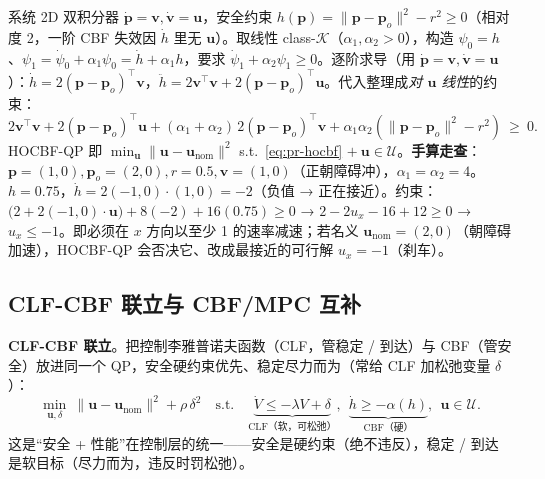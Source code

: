 \begin{derivation}\label{der:pr-hocbf}
系统 2D 双积分器 $\dot{\mathbf{p}}=\mathbf{v},\dot{\mathbf{v}}=\mathbf{u}$，安全约束 $h(\mathbf{p})=\|\mathbf{p}-\mathbf{p}_o\|^2-r^2\ge0$（相对度 2，一阶 CBF 失效因 $\dot h$ 里无 $\mathbf{u}$）。取线性 class-$\mathcal{K}$（$\alpha_1,\alpha_2>0$），构造 $\psi_0=h$、$\psi_1=\dot\psi_0+\alpha_1\psi_0=\dot h+\alpha_1 h$，要求 $\dot\psi_1+\alpha_2\psi_1\ge0$。逐阶求导（用 $\dot{\mathbf{p}}=\mathbf{v},\dot{\mathbf{v}}=\mathbf{u}$）：$\dot h=2(\mathbf{p}-\mathbf{p}_o)^\top\mathbf{v}$，$\ddot h=2\mathbf{v}^\top\mathbf{v}+2(\mathbf{p}-\mathbf{p}_o)^\top\mathbf{u}$。代入整理成\emph{对 $\mathbf{u}$ 线性}的约束：
\begin{equation}
  2\mathbf{v}^\top\mathbf{v}+2(\mathbf{p}-\mathbf{p}_o)^\top\mathbf{u}+(\alpha_1+\alpha_2)\,2(\mathbf{p}-\mathbf{p}_o)^\top\mathbf{v}+\alpha_1\alpha_2(\|\mathbf{p}-\mathbf{p}_o\|^2-r^2)\ \ge\ 0.
  \label{eq:pr-hocbf}
\end{equation}
HOCBF-QP 即 $\min_{\mathbf{u}}\|\mathbf{u}-\mathbf{u}_{\mathrm{nom}}\|^2$ s.t.\ \cref{eq:pr-hocbf} $+\ \mathbf{u}\in\mathcal{U}$。\textbf{手算走查}：$\mathbf{p}=(1,0),\mathbf{p}_o=(2,0),r=0.5,\mathbf{v}=(1,0)$（正朝障碍冲），$\alpha_1=\alpha_2=4$。$h=0.75$，$\dot h=2(-1,0)\cdot(1,0)=-2$（负值 → 正在接近）。约束：$\big(2+2(-1,0)\cdot\mathbf{u}\big)+8(-2)+16(0.75)\ge0$ → $2-2u_x-16+12\ge0$ → $u_x\le-1$。即必须在 $x$ 方向以至少 1 的速率减速；若名义 $\mathbf{u}_{\mathrm{nom}}=(2,0)$（朝障碍加速），HOCBF-QP 会否决它、改成最接近的可行解 $u_x=-1$（刹车）。
\end{derivation}

\subsection{CLF-CBF 联立与 CBF/MPC 互补}
\label{sec:pr-cbf-mpc}

\textbf{CLF-CBF 联立}。把控制李雅普诺夫函数（CLF，管稳定 / 到达）与 CBF（管安全）放进同一个 QP，安全硬约束优先、稳定尽力而为（常给 CLF 加松弛变量 $\delta$）：
\begin{equation}
  \min_{\mathbf{u},\delta}\ \|\mathbf{u}-\mathbf{u}_{\mathrm{nom}}\|^2+\rho\,\delta^2\quad\text{s.t.}\quad
  \underbrace{\dot V\le-\lambda V+\delta}_{\text{CLF（软，可松弛）}},\ \
  \underbrace{\dot h\ge-\alpha(h)}_{\text{CBF（硬）}},\ \ \mathbf{u}\in\mathcal{U}.
  \label{eq:pr-clf-cbf}
\end{equation}
这是“安全 + 性能”在控制层的统一——安全是硬约束（绝不违反），稳定 / 到达是软目标（尽力而为，违反时罚松弛）。

